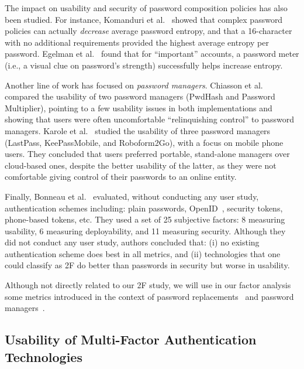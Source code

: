 \documentclass[conference]{IEEEtran}
\begin{document}
The impact on usability and security of password composition policies has also been studied. For instance, Komanduri et al.~\cite{komanduri2011passwords} showed that complex password policies can actually \textit{decrease} average password entropy, and that a 16-character with no additional requirements provided the highest average entropy per password. 
Egelman et al.~\cite{egelman2013does} found that for
``important'' accounts, a password meter (i.e., a visual clue on password's strength)  successfully helps increase entropy.  

Another line of work has focused on {\em password managers}.
Chiasson et al.~\cite{chiasson2006usability} compared the usability of two password managers (PwdHash and Password Multiplier), pointing to a few usability issues in both implementations and showing that users were often uncomfortable ``relinquishing control'' to password managers. 
Karole et al.~\cite{karole2011comparative} studied the usability of three password managers (LastPass, KeePassMobile, and Roboform2Go), with a focus on mobile phone users. They concluded that users preferred portable, stand-alone managers over cloud-based ones, despite the better usability of the latter, as they were not comfortable giving control of their passwords to an online entity. 

Finally, Bonneau et al.~\cite{bonneau2012quest} evaluated, without conducting any user study, authentication schemes including: plain passwords, OpenID~\cite{recordon2006openid}, security tokens, phone-based tokens, etc. They used a set of 25 subjective factors: 8 measuring usability, 6 measuring deployability, and 11 measuring security. Although they did not conduct any user study, authors concluded that: (i) no existing authentication scheme does best in all metrics, and (ii) technologies that one could classify as 2F do better than passwords in security but worse in usability.

Although not directly related to our 2F study, we will use in our factor analysis some metrics introduced in the context of password replacements~\cite{bonneau2012quest} and password managers~\cite{karole2011comparative}. 

\subsection{Usability of Multi-Factor Authentication Technologies}
\end{document}
